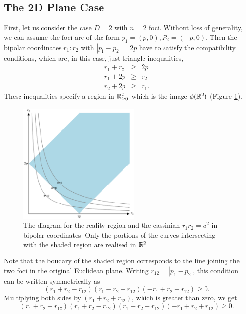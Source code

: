 \documentclass{article}
\begin{document}
\subsection{The 2D Plane Case}
\label{sec-1-4}
First, let us consider the case $D=2$ with $n=2$ foci. Without loss of generality, we can assume the foci are of the form $p_{1}=(p,0),P_{2}=(-p,0)$.
Then the bipolar coordinates $r_1 :r_2$ with $|p_1 -p_2| =2p$ have to satisfy the compatibility conditions,
which are, in this case, just triangle inequalities,
\begin{eqnarray}
 r_1 + r_2 & \ge & 2p \\
 r_1 +2p  & \ge & r_2  \\
 r_2 +2p  & \ge & r_1 .
\end{eqnarray}
These inequalities specify a region in $\mathbb R^2_{\ge0}$ which is the image $\phi(\mathbb R^{2})$ (Figure \ref{fig:bipolar-allowed-region}).
\begin{figure}[h]
\begin{center}
\includegraphics[width=6cm]{images/2cass_bipo.eps}
\caption{The diagram for the reality region and the cassinian $r_1r_2=a^2$ in bipolar coordinates. Only the portions of the curves intersecting with the shaded region are realised in $\mathbb R^2$}
\label{fig:bipolar-allowed-region}
\end{center}
\end{figure}
Note that the boudary of the shaded region corresponds to the line joining the two foci in the original Euclidean plane. Writing $r_{12}=|p_1 -p_2|$, this condition can be written symmetrically as
\begin{equation}
\label{}
(r_1 + r_2 - r_{12})(r_1 - r_2 + r_{12})(-r_1 + r_2 + r_{12}) \ge 0.
\end{equation}
Multiplying both sides by $(r_{1} + r_{2} + r_{12})$, which is greater than zero, we get
\begin{equation}
\label{eq:compat-2D}
(r_1 + r_2 + r_{12})(r_1 + r_2 - r_{12})(r_1 - r_2 + r_{12})(-r_1 + r_2 + r_{12}) \ge 0.
\end{equation}
\end{document}
